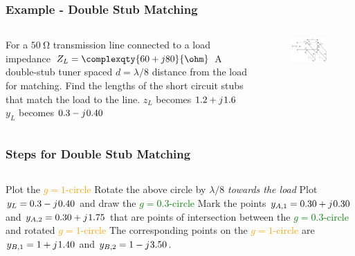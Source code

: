 \documentclass[10pt, compress]{beamer}
\renewcommand{\j}{{j}\mkern1mu} %
\begin{document}
\begin{frame}
    \frametitle{Example - Double Stub Matching}
    \begin{columns}[]
        \begin{column}[]{.5\textwidth}
            \begin{outline}
                \1 For a $\SI{50}{\ohm}$ transmission line connected to a load impedance $Z_L = \complexqty{60 + j 80}{\ohm}$
                \1 A double-stub tuner spaced $d = \lambda/8$ distance from the load for matching.
                \1 Find the lengths of the short circuit stubs that match the load to the line.
                \1 $z_L$ becomes $1.2 + \j 1.6$
                \1 $y_L$ becomes $0.3 - \j 0.40$
            \end{outline}
        \end{column}
        \begin{column}[]{.5\textwidth}
            \begin{figure}[]
                \centering
                \includegraphics[width=.9\textwidth]{tline_double_stub.pdf}
            \end{figure}
        \end{column}
    \end{columns}
\end{frame}

\begin{frame}
    \frametitle{Steps for Double Stub Matching}
    \begin{columns}[]
        \begin{column}[]{1\textwidth}
            \begin{outline}[enumerate]
                \1 Plot the \textcolor{orange}{$g =1 $-circle}
                \1 Rotate the above circle by $\lambda/8$ \textit{towards the load}
                \1 Plot $y_L = 0.3 - \j 0.40$ and draw the \textcolor{green}{$g=0.3$-circle}
                \1 Mark the points $y_{A,1} = 0.30 + \j 0.30$ and $y_{A,2} = 0.30 + \j 1.75$ that are points of intersection between the \textcolor{green}{$g=0.3$-circle} and rotated \textcolor{orange}{$g=1$-circle}
                \1 The corresponding points on the \textcolor{orange}{$g=1$-circle} are $y_{B,1} = 1 + \j 1.40$ and $y_{B,2} = 1 - \j 3.50$.
            \end{outline}
        \end{column}
    \end{columns}
\end{frame}
\end{document}
